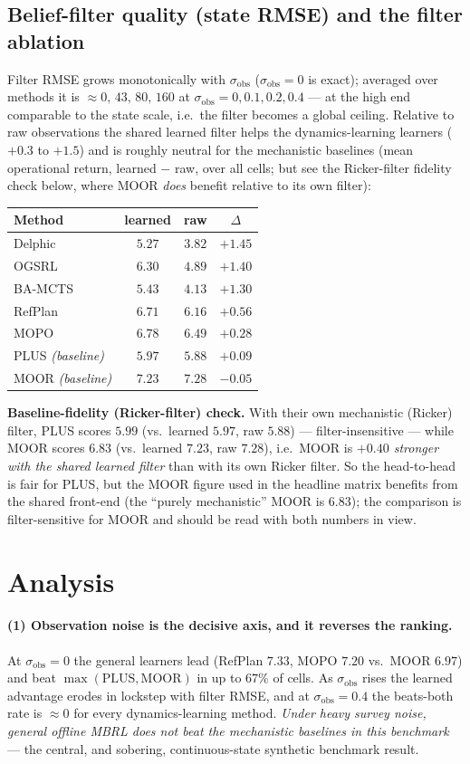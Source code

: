 \documentclass[11pt]{article}
\newcommand{\sobs}{\sigma_{\mathrm{obs}}}
\begin{document}
\subsection{Belief-filter quality (state RMSE) and the filter ablation}
Filter RMSE grows monotonically with $\sobs$ ($\sobs{=}0$ is exact); averaged over
methods it is $\approx 0,\,43,\,80,\,160$ at $\sobs{=}0,0.1,0.2,0.4$ --- at the
high end comparable to the state scale, i.e.\ the filter becomes a global ceiling.
Relative to raw observations the shared learned filter helps the dynamics-learning
learners ($+0.3$ to $+1.5$) and is roughly neutral for the mechanistic baselines
(mean operational return, learned $-$ raw, over all cells; but see the
Ricker-filter fidelity check below, where MOOR \emph{does} benefit relative to its
own filter):
\begin{longtable}{@{}lccc@{}}
\toprule
Method & learned & raw & $\Delta$ \\
\midrule
Delphic & $5.27$ & $3.82$ & $+1.45$ \\
OGSRL   & $6.30$ & $4.89$ & $+1.40$ \\
BA-MCTS & $5.43$ & $4.13$ & $+1.30$ \\
RefPlan & $6.71$ & $6.16$ & $+0.56$ \\
MOPO    & $6.78$ & $6.49$ & $+0.28$ \\
PLUS \emph{(baseline)}  & $5.97$ & $5.88$ & $+0.09$ \\
MOOR \emph{(baseline)}  & $7.23$ & $7.28$ & $-0.05$ \\
\bottomrule
\end{longtable}
\noindent\textbf{Baseline-fidelity (Ricker-filter) check.} With their own
mechanistic (Ricker) filter, PLUS scores $5.99$ (vs.\ learned $5.97$, raw $5.88$)
--- filter-insensitive --- while MOOR scores $6.83$ (vs.\ learned $7.23$, raw
$7.28$), i.e.\ MOOR is \emph{$+0.40$ stronger with the shared learned filter} than
with its own Ricker filter. So the head-to-head is fair for PLUS, but the MOOR
figure used in the headline matrix benefits from the shared front-end (the
``purely mechanistic'' MOOR is $6.83$); the comparison is filter-sensitive for MOOR
and should be read with both numbers in view.

\section{Analysis}
\label{sec:analysis}

\paragraph{(1) Observation noise is the decisive axis, and it reverses the ranking.}
At $\sobs{=}0$ the general learners lead (RefPlan $7.33$, MOPO $7.20$ vs.\ MOOR
$6.97$) and beat $\max(\text{PLUS},\text{MOOR})$ in up to $67\%$ of cells. As
$\sobs$ rises the learned advantage erodes in lockstep with filter RMSE, and at
$\sobs{=}0.4$ the beats-both rate is $\approx 0$ for every dynamics-learning
method. \emph{Under heavy survey noise, general offline MBRL does not beat the
mechanistic baselines in this benchmark} --- the central, and sobering, continuous-state synthetic benchmark
result.
\end{document}
